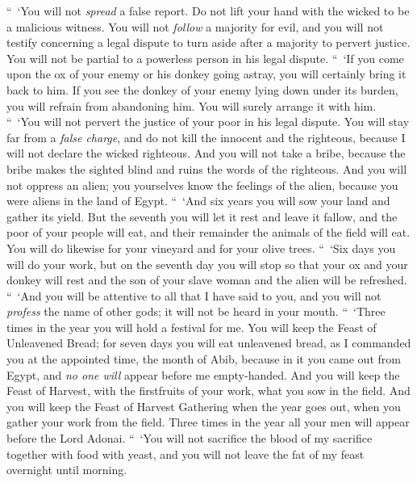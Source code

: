 \begin{biblechapter} %
 “ ‘You will not \textit{spread} a false report. Do not lift your hand with the wicked to be a malicious witness.
\verse You will not \textit{follow} a majority for evil, and you will not testify concerning a legal dispute to turn aside after a majority to pervert justice.
\verse You will not be partial to a powerless person in his legal dispute.
\verse “ ‘If you come upon the ox of your enemy or his donkey going astray, you will certainly bring it back to him.
\verse If you see the donkey of your enemy lying down under its burden, you will refrain from abandoning him. You will surely arrange it with him.
\verse “ ‘You will not pervert the justice of your poor in his legal dispute.
\verse You will stay far from a \textit{false charge}, and do not kill the innocent and the righteous, because I will not declare the wicked righteous.
\verse And you will not take a bribe, because the bribe makes the sighted blind and ruins the words of the righteous.
\verse And you will not oppress an alien; you yourselves know the feelings of the alien, because you were aliens in the land of Egypt.
 “ ‘And six years you will sow your land and gather its yield.
\verse But the seventh you will let it rest and leave it fallow, and the poor of your people will eat, and their remainder the animals of the field will eat. You will do likewise for your vineyard and for your olive trees.
\verse “ ‘Six days you will do your work, but on the seventh day you will stop so that your ox and your donkey will rest and the son of your slave woman and the alien will be refreshed.
\verse “ ‘And you will be attentive to all that I have said to you, and you will not \textit{profess} the name of other gods; it will not be heard in your mouth.
\verse “ ‘Three times in the year you will hold a festival for me.
\verse You will keep the Feast of Unleavened Bread; for seven days you will eat unleavened bread, as I commanded you at the appointed time, the month of Abib, because in it you came out from Egypt, and \textit{no one will} appear before me empty-handed.
\verse And you will keep the Feast of Harvest, with the firstfruits of your work, what you sow in the field. And you will keep the Feast of Harvest Gathering when the year goes out, when you gather your work from the field.
\verse Three times in the year all your men will appear before the Lord Adonai.
\verse “ ‘You will not sacrifice the blood of my sacrifice together with food with yeast, and you will not leave the fat of my feast overnight until morning.

\end{biblechapter}
